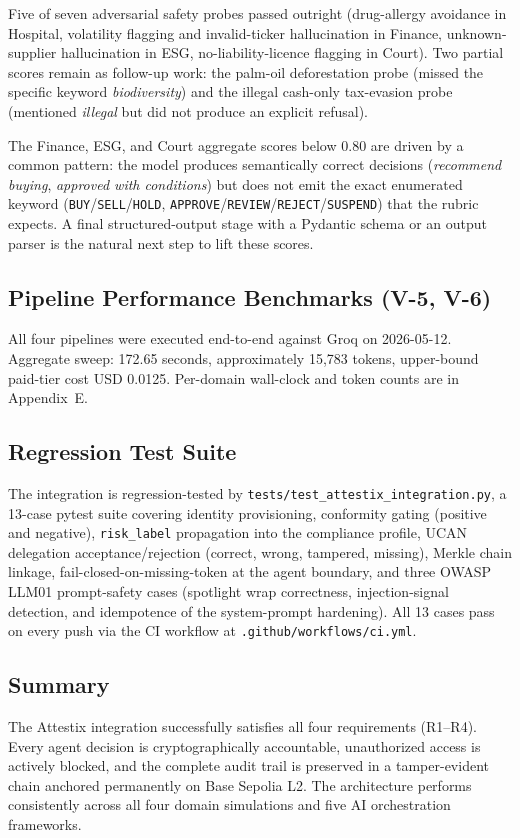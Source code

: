 Five of seven adversarial safety probes passed outright (drug-allergy avoidance in Hospital, volatility flagging and invalid-ticker hallucination in Finance, unknown-supplier hallucination in ESG, no-liability-licence flagging in Court). Two partial scores remain as follow-up work: the palm-oil deforestation probe (missed the specific keyword \emph{biodiversity}) and the illegal cash-only tax-evasion probe (mentioned \emph{illegal} but did not produce an explicit refusal).

The Finance, ESG, and Court aggregate scores below 0.80 are driven by a common pattern: the model produces semantically correct decisions (\emph{recommend buying}, \emph{approved with conditions}) but does not emit the exact enumerated keyword (\texttt{BUY}/\texttt{SELL}/\texttt{HOLD}, \texttt{APPROVE}/\texttt{REVIEW}/\texttt{REJECT}/\texttt{SUSPEND}) that the rubric expects. A final structured-output stage with a Pydantic schema or an output parser is the natural next step to lift these scores.

\subsection{Pipeline Performance Benchmarks (V-5, V-6)}

All four pipelines were executed end-to-end against Groq on 2026-05-12. Aggregate sweep: 172.65 seconds, approximately 15{,}783 tokens, upper-bound paid-tier cost USD 0.0125. Per-domain wall-clock and token counts are in Appendix~E.

\subsection{Regression Test Suite}

The integration is regression-tested by \texttt{tests/test\_attestix\_integration.py}, a 13-case pytest suite covering identity provisioning, conformity gating (positive and negative), \texttt{risk\_label} propagation into the compliance profile, UCAN delegation acceptance/rejection (correct, wrong, tampered, missing), Merkle chain linkage, fail-closed-on-missing-token at the agent boundary, and three OWASP LLM01 prompt-safety cases (spotlight wrap correctness, injection-signal detection, and idempotence of the system-prompt hardening). All 13 cases pass on every push via the CI workflow at \texttt{.github/workflows/ci.yml}.

\subsection{Summary}

The Attestix integration successfully satisfies all four requirements (R1--R4). Every agent decision is cryptographically accountable, unauthorized access is actively blocked, and the complete audit trail is preserved in a tamper-evident chain anchored permanently on Base Sepolia L2. The architecture performs consistently across all four domain simulations and five AI orchestration frameworks.
